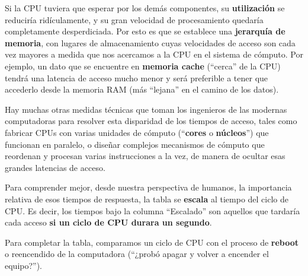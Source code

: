 \documentclass[spanish,a4paper,]{article}
\begin{document}
Si la CPU tuviera que esperar por los demás componentes, su
\textbf{utilización} se reduciría ridículamente, y su gran velocidad de
procesamiento quedaría completamente desperdiciada. Por esto es que se
establece una \textbf{jerarquía de memoria}, con lugares de
almacenamiento cuyas velocidades de acceso son cada vez mayores a medida
que nos acercamos a la CPU en el sistema de cómputo. Por ejemplo, un
dato que se encuentre en \textbf{memoria cache} (``cerca'' de la CPU)
tendrá una latencia de acceso mucho menor y será preferible a tener que
accederlo desde la memoria RAM (más ``lejana'' en el camino de los
datos).

Hay muchas otras medidas técnicas que toman los ingenieros de las
modernas computadoras para resolver esta disparidad de los tiempos de
acceso, tales como fabricar CPUs con varias unidades de cómputo
(``\textbf{cores} o \textbf{núcleos}'') que funcionan en paralelo, o
diseñar complejos mecanismos de cómputo que reordenan y procesan varias
instrucciones a la vez, de manera de ocultar esas grandes latencias de
acceso.

Para comprender mejor, desde nuestra perspectiva de humanos, la
importancia relativa de esos tiempos de respuesta, la tabla se
\textbf{escala} al tiempo del ciclo de CPU. Es decir, los tiempos bajo
la columna ``Escalado'' son aquellos que tardaría cada acceso \textbf{si
un ciclo de CPU durara un segundo}.

Para completar la tabla, comparamos un ciclo de CPU con el proceso de
\textbf{reboot} o reencendido de la computadora (``¿probó apagar y
volver a encender el equipo?'').
\end{document}
